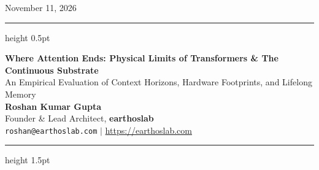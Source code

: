 \documentclass[11pt,a4paper]{article}
\begin{document}
\thispagestyle{plain}
\enlargethispage{2.0\baselineskip}

 \hfill {\small\textsf{\color{gray}November 11, 2026}}
\vspace{1.0mm}
\hrule height 0.5pt
\vspace{2.5mm}

\begin{center}
  {\LARGE \textbf{\sffamily Where Attention Ends: Physical Limits of Transformers \& The Continuous Substrate}}\\[0.30em]
  {\large \textsf{\color{darkslate}An Empirical Evaluation of Context Horizons, Hardware Footprints, and Lifelong Memory}}\\[0.5em]
  
  {\large \textbf{\sffamily Roshan Kumar Gupta}}\\[0.10em]
  {\normalsize \textsf{Founder \& Lead Architect, \textbf{earthoslab}}}\\[0.15em]
  {\small \texttt{roshan@earthoslab.com} \quad $\vert$ \quad \url{https://earthoslab.com}}\\[0.30em]
  \vspace{0.1em}
  {\color{brandblue}\hrule height 1.5pt}
\end{center}

\vspace{0.2em}
\end{document}
